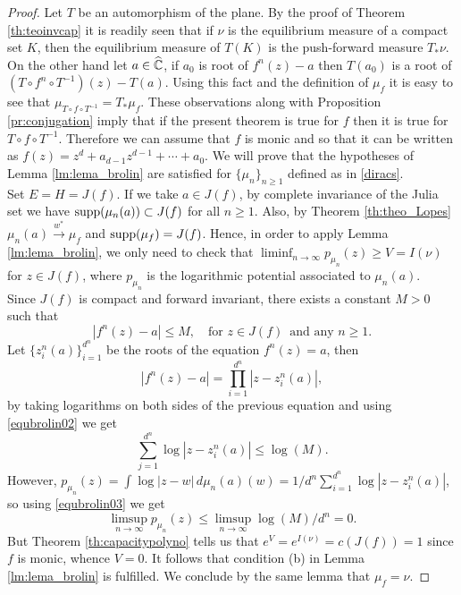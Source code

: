 \begin{proof}
Let $T$ be an automorphism of the plane. By the proof of Theorem \ref{th:teoinvcap} it is readily seen that if $\nu$ is the equilibrium measure of a compact set $K$, then the equilibrium measure of $T(K)$ is the push-forward measure $T_* \nu$. On the other hand let $a\in \widehat{\mathbb{C}}$, if $a_0$ is root of $f^{n}(z)-a$ then $T(a_0)$ is a root of $(T\circ f^n \circ T^{-1})(z) - T(a)$. Using this fact and the definition of $\mu_f$ it is easy to see that $\mu_{T\circ f \circ T^{-1}} = T_*\mu_f$. These observations along with Proposition \ref{pr:conjugation} imply that if the present theorem is true for $f$ then it is true for $T\circ f \circ T^{-1}$. Therefore we can assume that $f$ is monic and so that it can be written as $f(z) = z^d+a_{d-1}z^{d-1}+\cdots + a_0$. We will prove that the hypotheses of Lemma \ref{lm:lema_brolin} are satisfied for $\{\mu_n\}_{n\geq 1}$ defined as in \eqref{diracs}.\\

 Set $E=H=J(f)$. If we take $a\in J(f)$, by complete invariance of the Julia set we have $\text{supp}(\mu_n(a))\subset J(f)$ for all $n\geq 1$. Also, by Theorem \ref{th:theo_Lopes} $\mu_n(a) \overset{w^*}{\rightarrow} \mu_f$ and $\text{supp}(\mu_f) =J(f)$. Hence, in order to apply Lemma \ref{lm:lema_brolin}, we only need to check that $\liminf_{n\rightarrow \infty} p_{\mu_n}(z) \geq V=I(\nu)$ for $z\in J(f)$, where $p_{\mu_n}$ is the logarithmic potential associated to $\mu_n(a)$.\\

Since $J(f)$ is compact and forward invariant, there exists a constant $M>0$ such that 
\begin{equation}\label{equbrolin02}
|f^n(z)-a| \leq M, \quad \text{for }z\in J(f)\, \text{ and any } n\geq 1.
\end{equation}
Let $\{z_i^n(a)\}_{i=1}^{d^n}$ be the roots of the equation $f^n(z) = a$, then
$$|f^n(z) - a| = \prod_{i=1}^{d^n} |z-z_i^n(a)|,$$
by taking logarithms on both sides of the previous equation and using \eqref{equbrolin02} we get
\begin{equation}\label{equbrolin03}
\sum_{j=1}^{d^n} \log|z-z_i^n(a)| \leq \log(M).
\end{equation}
However, $p_{\mu_n}(z) = \int \log|z-w|\,d\mu_n(a)(w) = 1/d^n \sum_{i=1}^{d^n} \log|z-z_i^n(a)|$, so using \eqref{equbrolin03} we get
$$\limsup_{n\rightarrow \infty} p_{\mu_n}(z) \leq \limsup_{n\rightarrow \infty} \log(M)/d^n = 0.$$
But Theorem \ref{th:capacitypolyno} tells us that $e^V = e^{I(\nu)}=c(J(f)) = 1$ since $f$ is monic, whence $V=0$. It follows that condition (b) in Lemma \ref{lm:lema_brolin} is fulfilled. We conclude by the same lemma that $\mu_f = \nu$.
\end{proof}

